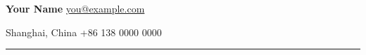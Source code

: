 \documentclass[10pt,a4paper]{article}
\begin{document}
{\LARGE\bfseries Your Name} \hfill
\href{mailto:you@example.com}{you@example.com}

Shanghai, China \hfill +86 138 0000 0000

\vspace{0.5em}
{\color{accent}\hrule}




\end{document}
